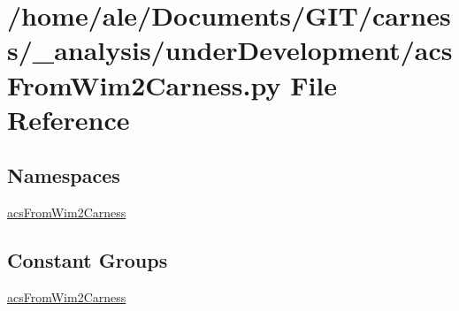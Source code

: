 \hypertarget{a00037}{\section{/home/ale/\-Documents/\-G\-I\-T/carness/\-\_\-analysis/under\-Development/acs\-From\-Wim2\-Carness.py File Reference}
\label{a00037}
}
\subsection*{Namespaces}
\begin{DoxyCompactItemize}
\item 
\hyperlink{a00094}{acs\-From\-Wim2\-Carness}
\end{DoxyCompactItemize}
\subsection*{Constant Groups}
\begin{DoxyCompactItemize}
\item 
\hyperlink{a00094}{acs\-From\-Wim2\-Carness}
\end{DoxyCompactItemize}
